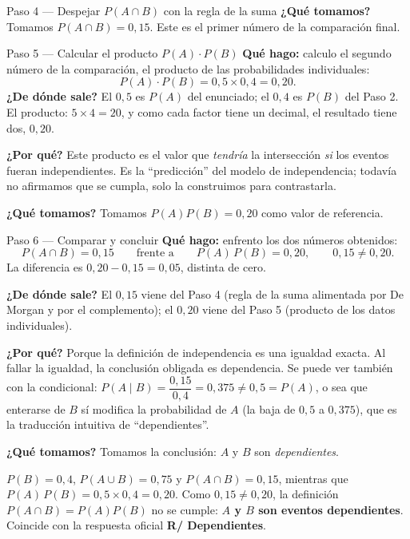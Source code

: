 \documentclass[11pt]{article}
\begin{document}
\begin{sol}
\begin{paso}{Paso 4 --- Despejar $P(A\cap B)$ con la regla de la suma}
\textbf{¿Qué tomamos?} Tomamos $P(A\cap B)=0{,}15$. Este es el primer número de la
comparación final.
\end{paso}

\begin{paso}{Paso 5 --- Calcular el producto $P(A)\cdot P(B)$}
\textbf{Qué hago:} calculo el segundo número de la comparación, el producto de las
probabilidades individuales:
\[
P(A)\cdot P(B)=0{,}5\times 0{,}4=0{,}20.
\]
\textbf{¿De dónde sale?} El $0{,}5$ es $P(A)$ del enunciado; el $0{,}4$ es $P(B)$ del Paso 2.
El producto: $5\times 4=20$, y como cada factor tiene un decimal, el resultado tiene dos,
$0{,}20$.

\textbf{¿Por qué?} Este producto es el valor que \emph{tendría} la intersección \emph{si} los
eventos fueran independientes. Es la ``predicción'' del modelo de independencia; todavía no
afirmamos que se cumpla, solo la construimos para contrastarla.

\textbf{¿Qué tomamos?} Tomamos $P(A)P(B)=0{,}20$ como valor de referencia.
\end{paso}

\begin{paso}{Paso 6 --- Comparar y concluir}
\textbf{Qué hago:} enfrento los dos números obtenidos:
\[
P(A\cap B)=0{,}15
\qquad\text{frente a}\qquad
P(A)\,P(B)=0{,}20,
\qquad 0{,}15\neq 0{,}20 .
\]
La diferencia es $0{,}20-0{,}15=0{,}05$, distinta de cero.

\textbf{¿De dónde sale?} El $0{,}15$ viene del Paso 4 (regla de la suma alimentada por De
Morgan y por el complemento); el $0{,}20$ viene del Paso 5 (producto de los datos
individuales).

\textbf{¿Por qué?} Porque la definición de independencia es una igualdad exacta. Al fallar la
igualdad, la conclusión obligada es dependencia. Se puede ver también con la condicional:
$P(A\mid B)=\dfrac{0{,}15}{0{,}4}=0{,}375\neq 0{,}5=P(A)$, o sea que enterarse de $B$ sí
modifica la probabilidad de $A$ (la baja de $0{,}5$ a $0{,}375$), que es la traducción
intuitiva de ``dependientes''.

\textbf{¿Qué tomamos?} Tomamos la conclusión: $A$ y $B$ son \emph{dependientes}.
\end{paso}
\end{sol}

\begin{resp}
$P(B)=0{,}4$, $P(A\cup B)=0{,}75$ y $P(A\cap B)=0{,}15$, mientras que
$P(A)\,P(B)=0{,}5\times0{,}4=0{,}20$. Como $0{,}15\neq 0{,}20$, la definición
$P(A\cap B)=P(A)P(B)$ no se cumple: \textbf{$A$ y $B$ son eventos dependientes}.
Coincide con la respuesta oficial \textbf{R/ Dependientes}.
\end{resp}
\end{document}
